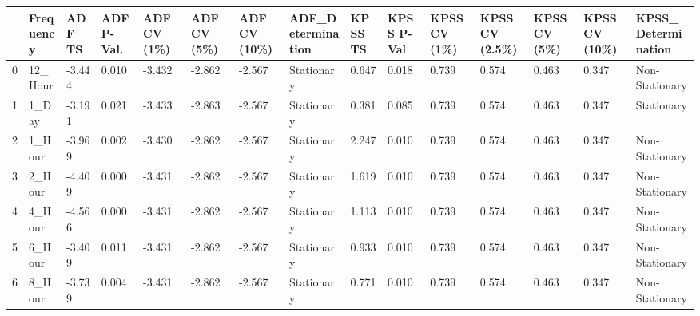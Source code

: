\begin{tabular}{lllllllllllllll}
\toprule
 & Frequency & ADF TS & ADF P-Val. & ADF CV (1\%) & ADF CV (5\%) & ADF CV (10\%) & ADF_Determination & KPSS TS & KPSS P-Val & KPSS CV (1\%) & KPSS CV (2.5\%) & KPSS CV (5\%) & KPSS CV (10\%) & KPSS_Determination \\
\midrule
0 & 12_Hour & -3.444 & 0.010 & -3.432 & -2.862 & -2.567 & Stationary & 0.647 & 0.018 & 0.739 & 0.574 & 0.463 & 0.347 & Non-Stationary \\
1 & 1_Day & -3.191 & 0.021 & -3.433 & -2.863 & -2.567 & Stationary & 0.381 & 0.085 & 0.739 & 0.574 & 0.463 & 0.347 & Stationary \\
2 & 1_Hour & -3.969 & 0.002 & -3.430 & -2.862 & -2.567 & Stationary & 2.247 & 0.010 & 0.739 & 0.574 & 0.463 & 0.347 & Non-Stationary \\
3 & 2_Hour & -4.409 & 0.000 & -3.431 & -2.862 & -2.567 & Stationary & 1.619 & 0.010 & 0.739 & 0.574 & 0.463 & 0.347 & Non-Stationary \\
4 & 4_Hour & -4.566 & 0.000 & -3.431 & -2.862 & -2.567 & Stationary & 1.113 & 0.010 & 0.739 & 0.574 & 0.463 & 0.347 & Non-Stationary \\
5 & 6_Hour & -3.409 & 0.011 & -3.431 & -2.862 & -2.567 & Stationary & 0.933 & 0.010 & 0.739 & 0.574 & 0.463 & 0.347 & Non-Stationary \\
6 & 8_Hour & -3.739 & 0.004 & -3.431 & -2.862 & -2.567 & Stationary & 0.771 & 0.010 & 0.739 & 0.574 & 0.463 & 0.347 & Non-Stationary \\
\bottomrule
\end{tabular}
